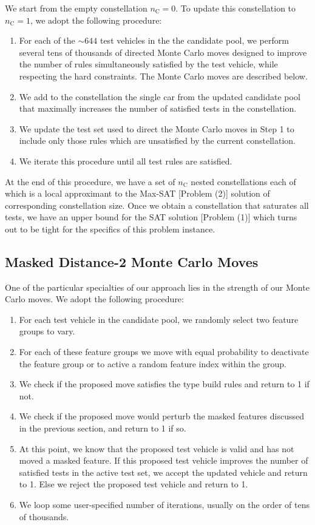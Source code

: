 \documentclass[aps,prl,twocolumn,superscriptaddress,groupedaddress]{revtex4}  %
\begin{document}
We start from the empty constellation $n_{\mathrm{C}} = 0$. To update this
constellation to $n_{\mathrm{C}} = 1$, we adopt the following procedure:
\begin{enumerate}
\item For each of the $\sim 644$ test vehicles in the the candidate pool, we
perform several tens of thousands of directed Monte Carlo moves designed to
improve the number of rules simultaneously satisfied by the test vehicle, while
respecting the hard constraints. The Monte Carlo moves are described below.
\item We add to the constellation the single car from the updated candidate pool
that maximally increases the number of satisfied tests in the constellation.
\item We update the test set used to direct the Monte Carlo moves in Step 1 to
include only those rules which are unsatisfied by the current constellation.
\item We iterate this procedure until all test rules are satisfied.
\end{enumerate}
At the end of this procedure, we have a set of $n_{\mathrm{C}}$ nested
constellations each of which is a local approximant to the Max-SAT [Problem (2)]
solution of corresponding constellation size. Once we obtain a constellation
that saturates all tests, we have an upper bound for the SAT solution [Problem
(1)] which turns out to be tight for the specifics of this problem instance.

\subsection{Masked Distance-2 Monte Carlo Moves}

One of the particular specialties of our approach lies in the strength of our
Monte Carlo moves. We adopt the following procedure:
\begin{enumerate}
\item For each test vehicle in the candidate pool, we randomly select two
feature groups to vary.
\item For each of these feature groups we move with equal probability to
deactivate the feature group or to active a random feature index within the
group.
\item We check if the proposed move satisfies the type build rules and return to
1 if not.
\item We check if the proposed move would perturb the masked features discussed
in the previous section, and return to 1 if so. 
\item At this point, we know that the proposed test vehicle is valid and has not
moved a masked feature. If this proposed test vehicle improves the number of
satisfied tests in the active test set, we accept the updated vehicle and return
to 1. Else we reject the proposed test vehicle and return to 1.
\item We loop some user-specified number of iterations, usually on the order of
tens of thousands.
\end{enumerate}
\end{document}

